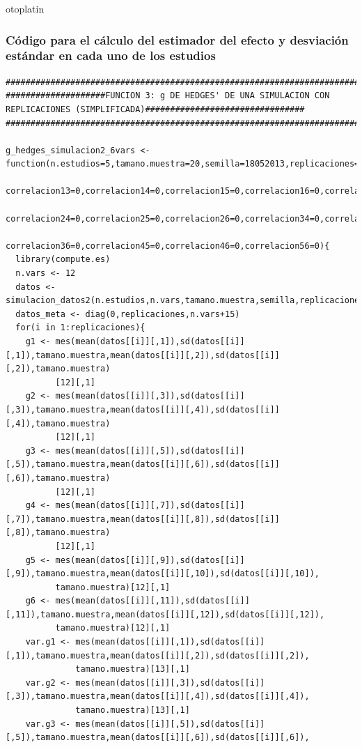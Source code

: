 otoplatin\documentclass[a4paper,openright,12pt]{report}
\begin{document}
\subsubsection{Código para el cálculo del estimador del efecto y desviación estándar en cada uno de los estudios}
{\tiny
\begin{verbatim}
##############################################################################################################################
####################FUNCION 3: g DE HEDGES' DE UNA SIMULACION CON REPLICACIONES (SIMPLIFICADA)################################
##############################################################################################################################

g_hedges_simulacion2_6vars <- function(n.estudios=5,tamano.muestra=20,semilla=18052013,replicaciones=5,correlacion12=0,
                                       correlacion13=0,correlacion14=0,correlacion15=0,correlacion16=0,correlacion23=0,
                                       correlacion24=0,correlacion25=0,correlacion26=0,correlacion34=0,correlacion35=0,
                                       correlacion36=0,correlacion45=0,correlacion46=0,correlacion56=0){
  library(compute.es)
  n.vars <- 12
  datos <- simulacion_datos2(n.estudios,n.vars,tamano.muestra,semilla,replicaciones) 
  datos_meta <- diag(0,replicaciones,n.vars+15)
  for(i in 1:replicaciones){
    g1 <- mes(mean(datos[[i]][,1]),sd(datos[[i]][,1]),tamano.muestra,mean(datos[[i]][,2]),sd(datos[[i]][,2]),tamano.muestra)
          [12][,1]
    g2 <- mes(mean(datos[[i]][,3]),sd(datos[[i]][,3]),tamano.muestra,mean(datos[[i]][,4]),sd(datos[[i]][,4]),tamano.muestra)
          [12][,1]
    g3 <- mes(mean(datos[[i]][,5]),sd(datos[[i]][,5]),tamano.muestra,mean(datos[[i]][,6]),sd(datos[[i]][,6]),tamano.muestra)
          [12][,1]
    g4 <- mes(mean(datos[[i]][,7]),sd(datos[[i]][,7]),tamano.muestra,mean(datos[[i]][,8]),sd(datos[[i]][,8]),tamano.muestra)
          [12][,1]
    g5 <- mes(mean(datos[[i]][,9]),sd(datos[[i]][,9]),tamano.muestra,mean(datos[[i]][,10]),sd(datos[[i]][,10]),
          tamano.muestra)[12][,1]
    g6 <- mes(mean(datos[[i]][,11]),sd(datos[[i]][,11]),tamano.muestra,mean(datos[[i]][,12]),sd(datos[[i]][,12]),
          tamano.muestra)[12][,1]
    var.g1 <- mes(mean(datos[[i]][,1]),sd(datos[[i]][,1]),tamano.muestra,mean(datos[[i]][,2]),sd(datos[[i]][,2]),
              tamano.muestra)[13][,1]
    var.g2 <- mes(mean(datos[[i]][,3]),sd(datos[[i]][,3]),tamano.muestra,mean(datos[[i]][,4]),sd(datos[[i]][,4]),
              tamano.muestra)[13][,1]
    var.g3 <- mes(mean(datos[[i]][,5]),sd(datos[[i]][,5]),tamano.muestra,mean(datos[[i]][,6]),sd(datos[[i]][,6]),

\end{verbatim}}
\end{document}
